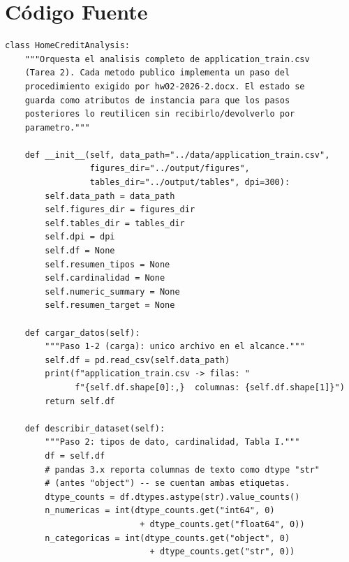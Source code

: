 \documentclass[conference]{IEEEtran}
\begin{document}
\section{Código Fuente}
\begin{strip}

\begin{lstlisting}[caption={Clase \texttt{HomeCreditAnalysis} -- un método por paso del procedimiento}, label={lst:analysis}]
class HomeCreditAnalysis:
    """Orquesta el analisis completo de application_train.csv
    (Tarea 2). Cada metodo publico implementa un paso del
    procedimiento exigido por hw02-2026-2.docx. El estado se
    guarda como atributos de instancia para que los pasos
    posteriores lo reutilicen sin recibirlo/devolverlo por
    parametro."""

    def __init__(self, data_path="../data/application_train.csv",
                 figures_dir="../output/figures",
                 tables_dir="../output/tables", dpi=300):
        self.data_path = data_path
        self.figures_dir = figures_dir
        self.tables_dir = tables_dir
        self.dpi = dpi
        self.df = None
        self.resumen_tipos = None
        self.cardinalidad = None
        self.numeric_summary = None
        self.resumen_target = None

    def cargar_datos(self):
        """Paso 1-2 (carga): unico archivo en el alcance."""
        self.df = pd.read_csv(self.data_path)
        print(f"application_train.csv -> filas: "
              f"{self.df.shape[0]:,}  columnas: {self.df.shape[1]}")
        return self.df

    def describir_dataset(self):
        """Paso 2: tipos de dato, cardinalidad, Tabla I."""
        df = self.df
        # pandas 3.x reporta columnas de texto como dtype "str"
        # (antes "object") -- se cuentan ambas etiquetas.
        dtype_counts = df.dtypes.astype(str).value_counts()
        n_numericas = int(dtype_counts.get("int64", 0)
                           + dtype_counts.get("float64", 0))
        n_categoricas = int(dtype_counts.get("object", 0)
                             + dtype_counts.get("str", 0))


\end{lstlisting}
\end{strip}
\end{document}
